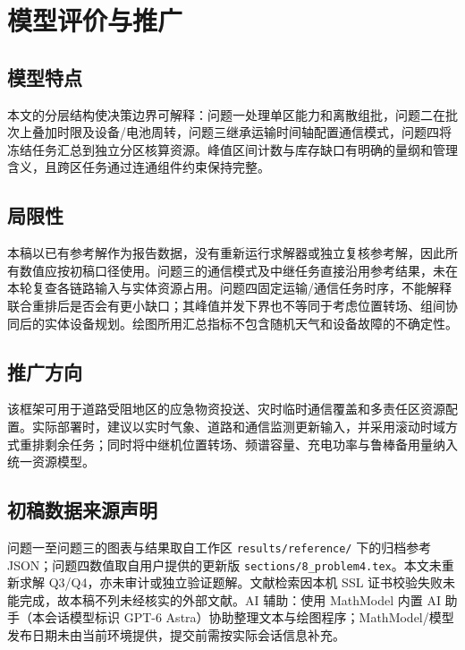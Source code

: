 \section{模型评价与推广}
\subsection{模型特点}
本文的分层结构使决策边界可解释：问题一处理单区能力和离散组批，问题二在批次上叠加时限及设备/电池周转，问题三继承运输时间轴配置通信模式，问题四将冻结任务汇总到独立分区核算资源。峰值区间计数与库存缺口有明确的量纲和管理含义，且跨区任务通过连通组件约束保持完整。

\subsection{局限性}
本稿以已有参考解作为报告数据，没有重新运行求解器或独立复核参考解，因此所有数值应按初稿口径使用。问题三的通信模式及中继任务直接沿用参考结果，未在本轮复查各链路输入与实体资源占用。问题四固定运输/通信任务时序，不能解释联合重排后是否会有更小缺口；其峰值并发下界也不等同于考虑位置转场、组间协同后的实体设备规划。绘图所用汇总指标不包含随机天气和设备故障的不确定性。

\subsection{推广方向}
该框架可用于道路受阻地区的应急物资投送、灾时临时通信覆盖和多责任区资源配置。实际部署时，建议以实时气象、道路和通信监测更新输入，并采用滚动时域方式重排剩余任务；同时将中继机位置转场、频谱容量、充电功率与鲁棒备用量纳入统一资源模型。

\subsection{初稿数据来源声明}
问题一至问题三的图表与结果取自工作区 \texttt{results/reference/} 下的归档参考 JSON；问题四数值取自用户提供的更新版 \texttt{sections/8\_problem4.tex}。本文未重新求解 Q3/Q4，亦未审计或独立验证题解。文献检索因本机 SSL 证书校验失败未能完成，故本稿不列未经核实的外部文献。AI 辅助：使用 MathModel 内置 AI 助手（本会话模型标识 GPT-6 Astra）协助整理文本与绘图程序；MathModel/模型发布日期未由当前环境提供，提交前需按实际会话信息补充。
